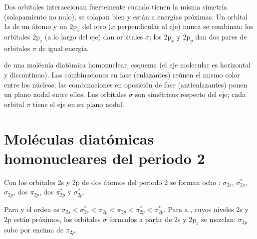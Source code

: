 Dos orbitales interaccionan fuertemente cuando tienen la misma simetría (solapamiento
no nulo), se solapan bien y están a energías próximas. Un orbital 1s de un átomo y un
$2\mathrm p_x$ del otro ($x$ perpendicular al eje) nunca se combinan;
los orbitales $2\mathrm p_z$ (a lo largo del eje) dan orbitales $\sigma$; los $2\mathrm p_x$ y
$2\mathrm p_y$ dan dos pares de orbitales $\pi$ de igual energía.

\begin{omfigure}

{\small {} de una molécula diatómica homonuclear, esquema (el eje
molecular es horizontal y discontinuo). Las combinaciones en fase (enlazantes) reúnen el
mismo color entre los núcleos; las combinaciones en oposición de fase (antienlazantes) ponen un
plano nodal entre ellos. Los orbitales $\sigma$ son simétricos respecto del eje; cada orbital $\pi$
tiene el eje en su plano nodal.}
\end{omfigure}

\section{Moléculas diatómicas homonucleares del periodo 2}

Con los orbitales 2s y 2p de dos átomos del periodo 2 se forman ocho :
$\sigma_{2s}$, $\sigma^*_{2s}$, $\sigma_{2p}$, dos $\pi_{2p}$, dos $\pi^*_{2p}$ y
$\sigma^*_{2p}$.

\begin{proposition}[Mezcla s--p]\label{prop:b2:diatomic-mos:sp-mixing}
Para  y  el orden es $\sigma_{2s} < \sigma^*_{2s} < \sigma_{2p} < \pi_{2p} <
\pi^*_{2p} < \sigma^*_{2p}$. Para  a , cuyos niveles 2s y 2p están próximos,
los orbitales $\sigma$ formados a partir de 2s y $2\mathrm p_z$ se mezclan: $\sigma_{2p}$ sube por encima de
$\pi_{2p}$.
\end{proposition}


